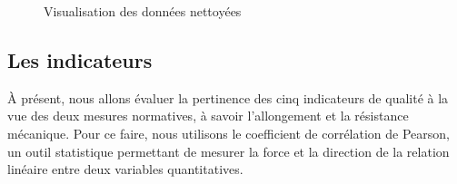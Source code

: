 \documentclass[12pt]{article}
\begin{document}
    


\begin{figure}[H]
    \centering
    \caption{Visualisation des données nettoyées}
    \label{fig:donnees_nettoyees}
\end{figure}




    


\subsection{Les indicateurs}

À présent, nous allons évaluer la pertinence des cinq indicateurs de 
qualité à la vue des deux mesures normatives, à savoir l'allongement 
et la résistance mécanique. Pour ce faire, nous utilisons le coefficient de corrélation de Pearson, 
un outil statistique permettant de mesurer la force et la direction de 
la relation linéaire entre deux variables quantitatives. 
\end{document}
